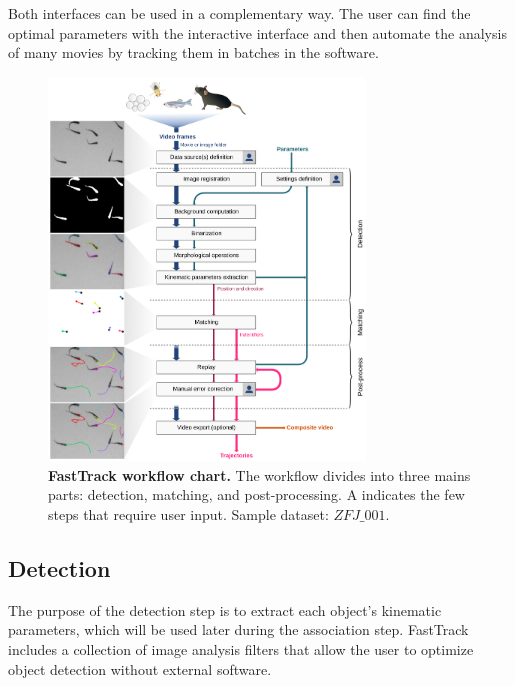     Both interfaces can be used in a complementary way. The user can find the optimal parameters with the interactive interface and then automate the analysis of many movies by tracking them in batches in the software.

    \begin{figure}[h!]
    \centering
    \includegraphics[width=0.75\textwidth]{part_1/assets/Figure_1.png}
    \caption{{\bf FastTrack workflow chart.} The workflow divides into three mains parts: detection, matching, and post-processing. A \faUser indicates the few steps that require user input. Sample dataset: $ZFJ\_001$.}
    \label{part_1:fig_1}
    \end{figure}

    \subsection{Detection}
    The purpose of the detection step is to extract each object's kinematic parameters, which will be used later during the association step. FastTrack includes a collection of image analysis filters that allow the user to optimize object detection without external software.

